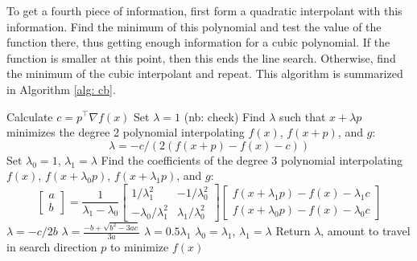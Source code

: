 \documentclass{article}
\numberwithin{equation}{section}
\begin{document}
To get a fourth piece of information, first form a quadratic interpolant with this information.
Find the minimum of this polynomial and test the value of the function there, thus getting enough information for a cubic polynomial.
If the function is smaller at this point, then this ends the line search.
Otherwise, find the minimum of the cubic interpolant and repeat.
This algorithm is summarized in Algorithm \ref{alg: cb}.
\begin{algorithm}
	\caption{Cubic backtracking \cite[Algorithm A6.3.1, pg325-327]{dennis1996numerical} \\
		$p$: search direction, $x$: current position, $f$: objective function, $\alpha$: bound on step size, $\tau$: tolerance (nb: of some kind, check)}
	\begin{algorithmic}[1]
	\State Calculate $c = p^\top \nabla f(x)$
		\State Set $\lambda = 1$
		\State (nb: check)
	\Else
		\State Find $\lambda$ such that $x + \lambda p$ minimizes the degree 2 polynomial interpolating $f(x)$, $f(x + p)$, and $g$: $$\lambda = -c / \left ( 2\left ( f(x+p) - f(x) - c \right ) \right )$$
		\State Set $\lambda_0=1$, $\lambda_1 = \lambda$
			\State Find the coefficients of the degree 3 polynomial interpolating $f(x)$, $f(x + \lambda_0 p)$, $f(x + \lambda_1 p)$, and $g$: $$\begin{bmatrix} a \\ b \end{bmatrix} = \frac{1}{\lambda_1 - \lambda_0} \begin{bmatrix} 1/\lambda_1^2 & -1/\lambda_0^2 \\  -\lambda_0/\lambda_1^2 & \lambda_1/\lambda_0^2 \end{bmatrix} \begin{bmatrix} f(x+\lambda_1 p) - f(x) - \lambda_1 c \\ f(x+\lambda_0 p) - f(x) - \lambda_0 c \end{bmatrix}$$
				\State $\lambda = -c / 2b$
			\Else
				\State $\lambda = \frac{-b + \sqrt{b^2 - 3a c}}{3a}$
			\EndIf
				\State $\lambda = 0.5 \lambda_1$
			\EndIf
			\State $\lambda_0 = \lambda_1$, $\lambda_1 = \lambda$
		\EndWhile
	\EndIf
	\State Return $\lambda$, amount to travel in search direction $p$ to minimize $f(x)$
	\end{algorithmic}
	\label{alg: cb}
\end{algorithm}
\end{document}
